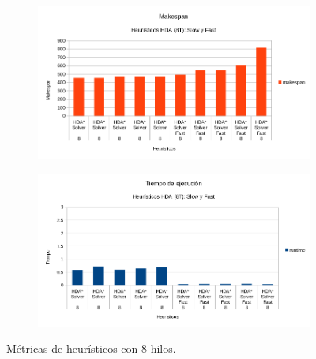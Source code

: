 \begin{figure}[h]
    \begin{subfigure}{.5\textwidth}
        \begin{center}
            \includegraphics[width=\textwidth]{Media/Ch2/Makespan_8_Heuristics.png}
        \end{center}
    \end{subfigure}
    \begin{subfigure}{.5\textwidth}
        \begin{center}
            \includegraphics[width=\textwidth]{Media/Ch2/Runtime_8_Heuristics.png}
        \end{center}
    \end{subfigure}
    \caption{Métricas de heurísticos con 8 hilos.}
    \label{fig:Heuristico8}
\end{figure}

